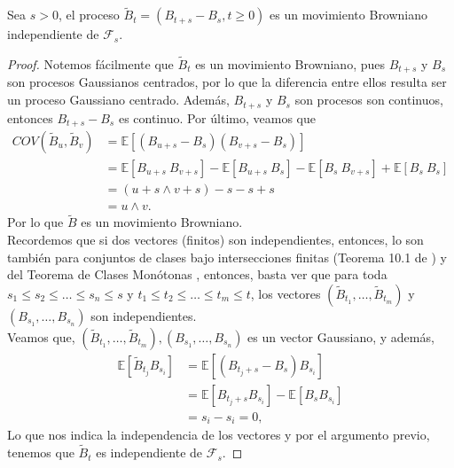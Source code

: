 \begin{theorem}
Sea $s > 0$, el proceso $\tilde{B}_t = (B_{t+s} - B_s, t \geq 0)$ es un movimiento Browniano independiente de $\mathcal{F}_s$.
\end{theorem}
\begin{proof}
Notemos fácilmente que $\tilde{B}_t$ es un movimiento Browniano, pues $B_{t+s}$ y $B_s$ son procesos Gaussianos centrados, por lo que la diferencia entre ellos resulta ser un proceso Gaussiano centrado. Además, $B_{t+s}$ y $B_s$ son procesos son continuos, entonces $B_{t+s} - B_s$ es continuo. Por último, veamos que
	\begin{align*}
	COV \left( \tilde{B}_u, \tilde{B}_v \right) & =  \mathbb{E} \left[ (B_{u+s} - B_s) (B_{v+s} - B_s) \right]  \\ 
	& = \mathbb{E} [B_{u+s} \ B_{v+s}] - \mathbb{E} [B_{u+s} \ B_s] - \mathbb{E}[B_s \ B_{v+s}] + \mathbb{E}[B_s \ B_s] \\
	& = (u + s \wedge v + s) - s - s + s  \\
	& = u  \wedge v. 
	\end{align*}
Por lo que $\tilde{B}$ es un movimiento Browniano. \\

Recordemos que si dos vectores (finitos) son independientes, entonces, lo son también para conjuntos de clases bajo intersecciones finitas (Teorema 10.1 de \cite[p.~65]{jacodprotter}) y del Teorema de Clases Monótonas \cite[p.~36]{jacodprotter}, entonces, basta ver que para toda $s_1 \leq s_2 \leq \ldots \leq s_n \leq s$ y $t_1 \leq t_2 \leq \ldots \leq t_m \leq t$, los vectores $(\tilde{B}_{t_1}, \ldots, \tilde{B}_{t_m})$ y $(B_{s_1}, \ldots, B_{s_n})$ son independientes. \\

Veamos que, $(\tilde{B}_{t_1}, \ldots, \tilde{B}_{t_m}), (B_{s_1}, \ldots, B_{s_n})$ es un vector Gaussiano, y además, 
	\begin{align*}
	\mathbb{E} \left[ \tilde{B}_{t_j} B_{s_i} \right] & = \mathbb{E} \left[ \left( B_{t_j + s} - B_s \right) B_{s_i} \right] \\
	& = \mathbb{E} \left[ B_{t_j + s}B_{s_i} \right] - \mathbb{E} \left[ B_s B_{s_i} \right] \\
	& = s_i - s_i = 0,
	\end{align*}
Lo que nos indica la independencia de los vectores y por el argumento previo, tenemos que $\tilde{B}_t$ es independiente de $\mathcal{F}_s$.
\end{proof}

